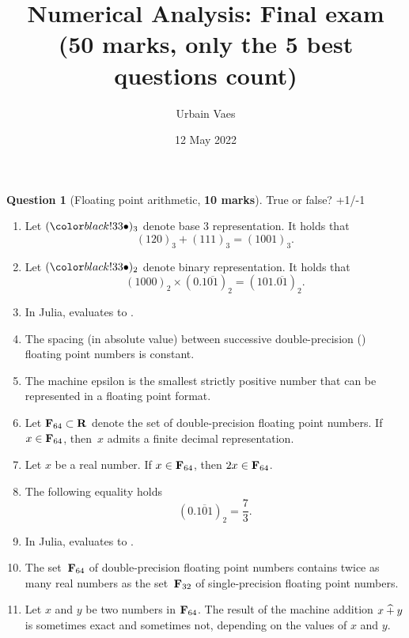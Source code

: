 \documentclass[11pt]{article}
\theoremstyle{definition}
\newtheorem{question}{Question}
\begin{document}
\title{Numerical Analysis: Final exam \\
\small{(\textbf{50 marks}, only the 5 best questions count)}}
\author{Urbain Vaes}
\date{12 May 2022}
\maketitle

\begin{question}
    [Floating point arithmetic, \textbf{10 marks}]
    True or false? +1/-1
    \begin{enumerate}
        \item
            Let $(\placeholder)_3$ denote base 3 representation.
            It holds that
            \[
                (120)_3 + (111)_3 = (1001)_3.
            \]
        \item
            Let $(\placeholder)_2$ denote binary representation.
            It holds that
            \[
                (1000)_2 \times (0.1\overline{01})_2 = (101.\overline{01})_2.
            \]

        \item In Julia,  evaluates to .

        \item The spacing (in absolute value) between successive double-precision () floating point numbers is constant.

        \item
            The machine epsilon is the smallest strictly positive number that can be represented in a floating point format.

        \item
            Let $\mathbf F_{64} \subset \mathbf R$ denote the set of double-precision floating point numbers.
            If $x \in \mathbf F_{64}$, then~$x$ admits a finite decimal representation.

        \item
            Let $x$ be a real number. If $x \in \mathbf F_{64}$, then $2x \in \mathbf F_{64}$.

        \item
            The following equality holds
            \[
                (0.\overline{101})_2 = \frac{7}{3}.
            \]

        \item
            In Julia,  evaluates to .

        \item
            The set~$\mathbf F_{64}$ of double-precision floating point numbers contains twice as many real numbers
            as the set~$\mathbf F_{32}$ of single-precision floating point numbers.

        \item
            Let $x$ and $y$ be two numbers in $\mathbf F_{64}$.
            The result of the machine addition $x \mathbin{\widehat +} y$ is sometimes exact and sometimes not,
            depending on the values of $x$ and $y$.
    \end{enumerate}
\end{question}
\end{document}
